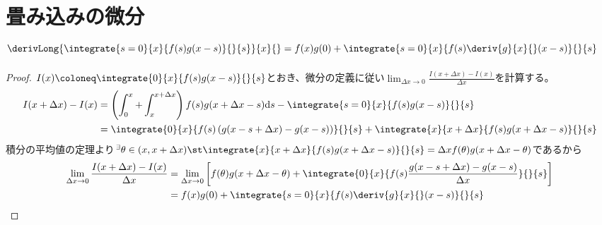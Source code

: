     \section{
        畳み込みの微分\texorpdfstring{\\}{}
        \texorpdfstring{$\derivLong{\integrate{s=0}{x}{f(s)g(x-s)}{}{s}}{x}{} = f(x)g(0) + \integrate{s=0}{x}{f(s)\deriv{g}{x}{}(x-s)}{}{s}$}{}
    }
        \begin{proof}
            \newcommand{\dx}{{\Delta x}}
            \renewcommand{\d}[1]{{\mathrm{d}#1}}
            \quad\par
            $I(x) \coloneq \integrate{0}{x}{f(s)g(x-s)}{}{s}$とおき、微分の定義に従い$\lim_{\dx\to 0}\frac{I(x+\dx)-I(x)}{\dx}$を計算する。
            \begin{align*}
                I(x+\dx)-I(x) &= \left(\int_{0}^{x}+\int_{x}^{x+\dx}\right)f(s)g(x+\dx-s)\d{s} - \integrate{s=0}{x}{f(s)g(x-s)}{}{s} \\
                &= \integrate{0}{x}{f(s)\left(g(x-s+\dx)-g(x-s)\right)}{}{s} + \integrate{x}{x+\dx}{f(s)g(x+\dx-s)}{}{s}
            \end{align*}
            積分の平均値の定理より$^\exists\theta\in(x,x+\dx)\st\integrate{x}{x+\dx}{f(s)g(x+\dx-s)}{}{s} = \dx f(\theta)g(x+\dx-\theta)$であるから
            \begin{align*}
                \lim_{\dx\to 0}\frac{I(x+\dx)-I(x)}{\dx} &= \lim_{\dx\to 0}\left[f(\theta)g(x+\dx-\theta) + \integrate{0}{x}{f(s)\frac{g(x-s+\dx)-g(x-s)}{\dx}}{}{s}\right] \\
                &= f(x)g(0) + \integrate{s=0}{x}{f(s)\deriv{g}{x}{}(x-s)}{}{s}
            \end{align*}
        \end{proof}
